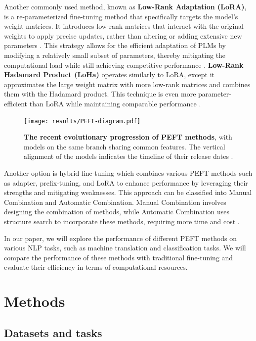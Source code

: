 \documentclass[fleqn,moreauthors,10pt]{ds_report}
\begin{document}
Another commonly used method, known as \textbf{Low-Rank Adaptation (LoRA)}, is a re-parameterized fine-tuning method that specifically targets the model's weight matrices. It introduces low-rank matrices that interact with the original weights to apply precise updates, rather than altering or adding extensive new parameters \cite{hu_lora_2021}. This strategy allows for the efficient adaptation of PLMs by modifying a relatively small subset of parameters, thereby mitigating the computational load while still achieving competitive performance \cite{zeng_expressive_2024, dinh_lift_2022}. \textbf{Low-Rank Hadamard Product (LoHa)} operates similarly to LoRA, except it approximates the large weight matrix with more low-rank matrices and combines them with the Hadamard product. This technique is even more parameter-efficient than LoRA while maintaining comparable performance \cite{nam2021fedpara}.

\begin{figure}[ht]\centering
	\texttt{[image: results/PEFT-diagram.pdf]}
	\caption{\textbf{The recent evolutionary progression of PEFT methods}, with models on the same branch sharing common features. The vertical alignment of the models indicates the timeline of their release dates \cite{Xu2023}.}
	\label{fig:PEFT-diagram}
\end{figure}


Another option is hybrid fine-tuning which combines various PEFT methods such as adapter, prefix-tuning, and LoRA to enhance performance by leveraging their strengths and mitigating weaknesses. This approach can be classified into Manual Combination and Automatic Combination. Manual Combination involves designing the combination of methods, while Automatic Combination uses structure search to incorporate these methods, requiring more time and cost \cite{mao2021unipelt, zhou2023autopeft}.

In our paper, we will explore the performance of different PEFT methods on various NLP tasks, such as machine translation and classification tasks. We will compare the performance of these methods with traditional fine-tuning and evaluate their efficiency in terms of computational resources.

\section*{Methods}

    \subsection*{Datasets and tasks}
\end{document}
